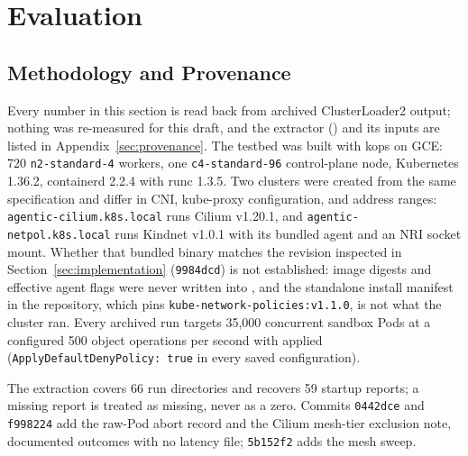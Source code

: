 \section{Evaluation}
\label{sec:evaluation}

\subsection{Methodology and Provenance}
\label{sec:eval-method}
Every number in this section is read back from archived ClusterLoader2
output; nothing was re-measured for this draft, and the extractor
() and its inputs are listed in
Appendix~\ref{sec:provenance}. The testbed was built with kops on GCE:
720 \texttt{n2-standard-4} workers, one \texttt{c4-standard-96}
control-plane node, Kubernetes 1.36.2, containerd 2.2.4 with runc 1.3.5.
Two clusters were created from the same specification and differ in CNI,
kube-proxy configuration, and address ranges:
\texttt{agentic-cilium.k8s.local} runs Cilium v1.20.1, and
\texttt{agentic-netpol.k8s.local} runs Kindnet v1.0.1 with its bundled
\sys{} agent and an NRI socket mount. Whether that bundled binary matches
the revision inspected in Section~\ref{sec:implementation}
(\texttt{9984dcd}) is not established: image digests and effective agent
flags were never written into , and the
standalone install manifest in the repository, which pins
\texttt{kube-network-policies:v1.1.0}, is not what the cluster ran. Every
archived run targets 35,000 concurrent sandbox Pods at a configured 500
object operations per second with 
applied (\texttt{ApplyDefaultDenyPolicy: true} in every saved
configuration).

The extraction covers 66 run directories and recovers 59 startup
reports; a missing report is treated as missing, never as a zero.
Commits \texttt{0442dce} and \texttt{f998224} add the raw-Pod abort
record and the Cilium mesh-tier exclusion note, documented outcomes with
no latency file; \texttt{5b152f2} adds the \sys{} mesh sweep.

